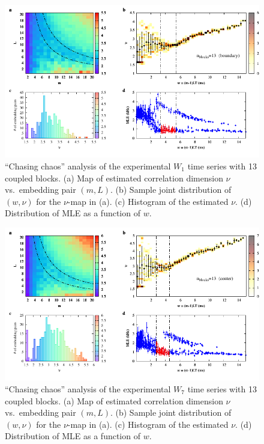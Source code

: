 \begin{figure}[ht!]
    \centering
    \includegraphics[width=\linewidth]{../blocks/13_blocks/edge/2e5_points/plots/chaos_low.pdf}
    \caption{``Chasing chaos'' analysis of the experimental $W_1$ time series with 13 coupled blocks.
    (a) Map of estimated correlation dimension $\nu$ vs.\ embedding pair $(m, L)$.
    (b) Sample joint distribution of $(w,\nu)$ for the $\nu$-map in (a).
    (c) Histogram of the estimated $\nu$. (d) Distribution of MLE as a function of $w$.
    }\label{fig: 13 blocks chaos boundary}
\end{figure}

\begin{figure}[ht!]
    \centering
    \includegraphics[width=\linewidth]{../blocks/13_blocks/middle/2e5_points/plots/chaos_low.pdf}
    \caption{``Chasing chaos'' analysis of the experimental $W_7$ time series with 13 coupled blocks.
    (a) Map of estimated correlation dimension $\nu$ vs.\ embedding pair $(m, L)$.
    (b) Sample joint distribution of $(w,\nu)$ for the $\nu$-map in (a).
    (c) Histogram of the estimated $\nu$. (d) Distribution of MLE as a function of $w$.
    }\label{fig: 13 blocks chaos center}
\end{figure}




